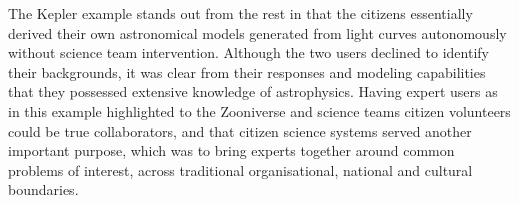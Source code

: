 \documentclass{sigchi}
\begin{document}
The Kepler example stands out from the rest in that the citizens essentially derived their own astronomical models generated from light curves autonomously without science team intervention.  Although the two users declined to identify their backgrounds, it was clear from their responses and modeling capabilities that they possessed extensive knowledge of astrophysics. Having expert users as in this example highlighted to the Zooniverse and science teams citizen volunteers could be true collaborators, and that citizen science systems served another important purpose, which was to bring experts together around common problems of interest, across traditional organisational, national and cultural boundaries.


\end{document}
